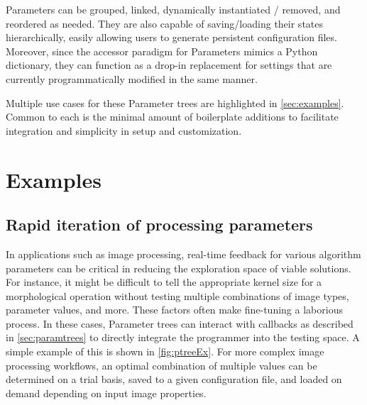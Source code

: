 \documentclass[journal]{vgtc}                %
\begin{document}
Parameters can be grouped, linked, dynamically instantiated / removed, and reordered as needed. They are also capable of saving/loading their states hierarchically, easily allowing users to generate persistent configuration files. Moreover, since the accessor paradigm for Parameters mimics a Python dictionary, they can function as a drop-in replacement for settings that are currently programmatically modified in the same manner.

Multiple use cases for these Parameter trees are highlighted in \autoref{sec:examples}. Common to each is the minimal amount of boilerplate additions to facilitate integration and simplicity in setup and customization.


\section{Examples}\label{sec:examples}

\color{DarkOrchid}
\subsection{Rapid iteration of processing parameters}
\color{Black}
In applications such as image processing, real-time feedback for various algorithm parameters can be critical in reducing the exploration space of viable solutions. For instance, it might be difficult to tell the appropriate kernel size for a morphological operation without testing multiple combinations of image types, parameter values, and more. These factors often make fine-tuning a laborious process. In these cases, Parameter trees can interact with callbacks as described in \autoref{sec:paramtrees} to directly integrate the programmer into the testing space. A simple example of this is shown in \autoref{fig:ptreeEx}. For more complex image processing workflows, an optimal combination of multiple values can be determined on a trial basis, saved to a given configuration file, and loaded on demand depending on input image properties.
\makePtreeExFig
\end{document}
